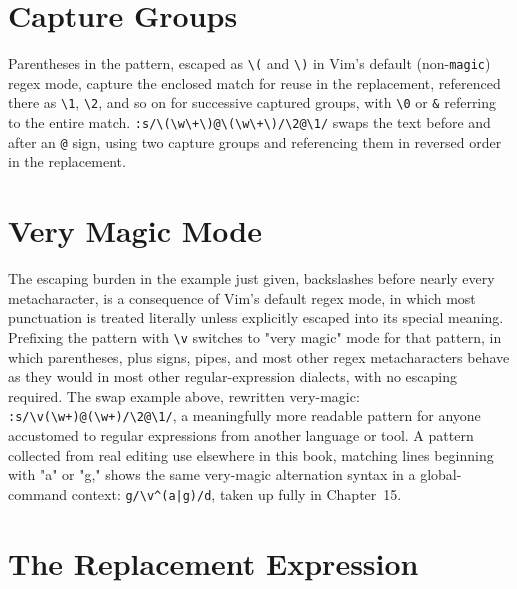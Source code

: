 \section{Capture Groups}

Parentheses in the pattern, escaped as \texttt{\textbackslash(} and \texttt{\textbackslash)} in Vim's default (non-\texttt{magic}) regex mode, capture the enclosed match for reuse in the replacement, referenced there as \texttt{\textbackslash1}, \texttt{\textbackslash2}, and so on for successive captured groups, with \texttt{\textbackslash0} or \texttt{\&} referring to the entire match. \texttt{:s/\textbackslash(\textbackslash w\textbackslash+\textbackslash)@\textbackslash(\textbackslash w\textbackslash+\textbackslash)/\textbackslash2@\textbackslash1/} swaps the text before and after an \texttt{@} sign, using two capture groups and referencing them in reversed order in the replacement.

\section{Very Magic Mode}

The escaping burden in the example just given, backslashes before nearly every metacharacter, is a consequence of Vim's default regex mode, in which most punctuation is treated literally unless explicitly escaped into its special meaning. Prefixing the pattern with \texttt{\textbackslash v} switches to "very magic" mode for that pattern, in which parentheses, plus signs, pipes, and most other regex metacharacters behave as they would in most other regular-expression dialects, with no escaping required. The swap example above, rewritten very-magic: \texttt{:s/\textbackslash v(\textbackslash w+)@(\textbackslash w+)/\textbackslash2@\textbackslash1/}, a meaningfully more readable pattern for anyone accustomed to regular expressions from another language or tool. A pattern collected from real editing use elsewhere in this book, matching lines beginning with "a" or "g," shows the same very-magic alternation syntax in a global-command context: \texttt{g/\textbackslash v\textasciicircum(a|g)/d}, taken up fully in Chapter~15.

\section{The Replacement Expression}

